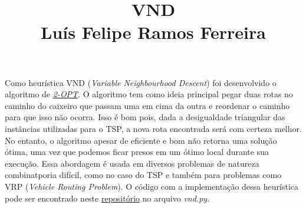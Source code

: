 \documentclass{article}
\title{\vspace{-3em} VND \\ Luís Felipe Ramos Ferreira \vspace{-3em}}
\date{}
\begin{document}
\maketitle

Como heurística VND (\textit{Variable Neighbourhood Descent}) foi desenvolvido o algoritmo de \href{https://en.wikipedia.org/wiki/2-opt}{\textit{2-OPT}}.
O algoritmo tem como ideia principal pegar duas rotas no caminho do caixeiro que passam uma em cima da outra e reordenar
o caminho para que isso não ocorra. Isso é bom pois, dada a desigualdade triangular das instâncias utilizadas para o TSP, a nova
rota encontrada será com certeza melhor. No entanto, o algoritmo apesar de eficiente e bom não retorna uma solução ótima,
uma vez que podemos ficar presos em um ótimo local durante sua execução. Essa abordagem é usada em diversos problemas de natureza combinatporia difícil,
como no caso do TSP e também para problemas como VRP (\textit{Vehicle Routing Problem}). O código com a implementação
dessa heurística pode ser encontrado neste \href{https://github.com/lframosferreira/tsp-heuristics}{repositório} no arquivo \textit{vnd.py}.
\end{document}
